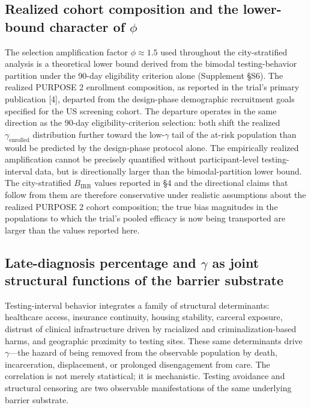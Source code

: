 \documentclass[12pt]{article}
\begin{document}
\subsection{Realized cohort composition and the lower-bound character of \texorpdfstring{$\phi$}{phi}}

The selection amplification factor $\phi \approx 1.5$ used throughout the city-stratified analysis is a theoretical lower bound derived from the bimodal testing-behavior partition under the 90-day eligibility criterion alone (Supplement \S S6). The realized PURPOSE 2 enrollment composition, as reported in the trial's primary publication [4], departed from the design-phase demographic recruitment goals specified for the US screening cohort. The departure operates in the same direction as the 90-day eligibility-criterion selection: both shift the realized $\gamma_{\mathrm{enrolled}}$ distribution further toward the low-$\gamma$ tail of the at-risk population than would be predicted by the design-phase protocol alone. The empirically realized amplification cannot be precisely quantified without participant-level testing-interval data, but is directionally larger than the bimodal-partition lower bound. The city-stratified $B_{\mathrm{IRR}}$ values reported in \S 4 and the directional claims that follow from them are therefore conservative under realistic assumptions about the realized PURPOSE 2 cohort composition; the true bias magnitudes in the populations to which the trial's pooled efficacy is now being transported are larger than the values reported here.

\subsection{Late-diagnosis percentage and \texorpdfstring{$\gamma$}{gamma} as joint structural functions of the barrier substrate}

Testing-interval behavior integrates a family of structural determinants: healthcare access, insurance continuity, housing stability, carceral exposure, distrust of clinical infrastructure driven by racialized and criminalization-based harms, and geographic proximity to testing sites. These same determinants drive $\gamma$---the hazard of being removed from the observable population by death, incarceration, displacement, or prolonged disengagement from care. The correlation is not merely statistical; it is mechanistic. Testing avoidance and structural censoring are two observable manifestations of the same underlying barrier substrate.
\end{document}
